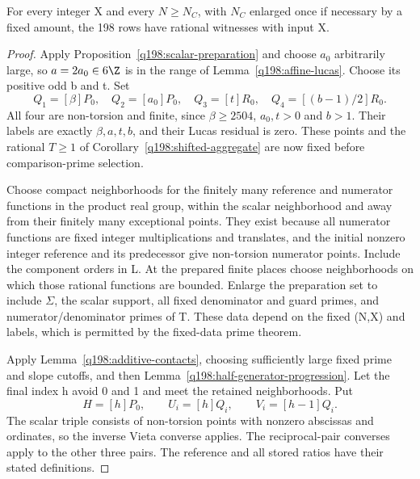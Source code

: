 \begin{proposition}\label{q198:completeness}
For every integer X and every $N\ge N_C$, with $N_C$ enlarged
once if necessary by a fixed amount, the 198 rows have rational
witnesses with input X.
\end{proposition}
\begin{proof}
Apply Proposition~\ref{q198:scalar-preparation} and choose $a_0$
arbitrarily large, so $a=2a_0\in6\Z$ is in the range of
Lemma~\ref{q198:affine-lucas}. Choose its positive odd b and t.
Set
\[
 Q_1=[\beta]P_0,\quad Q_2=[a_0]P_0,\quad Q_3=[t]R_0,\quad
 Q_4=[(b-1)/2]R_0.
\]
All four are non-torsion and finite, since $\beta\ge2504$,
$a_0,t>0$ and $b>1$. Their labels are exactly $\beta,a,t,b$,
and their Lucas residual is zero. These points and the rational
$T\ge1$ of Corollary~\ref{q198:shifted-aggregate} are now fixed
before comparison-prime selection.

Choose compact neighborhoods for the finitely many reference and
numerator functions in the product real group, within the scalar
neighborhood and away from their finitely many exceptional points.
They exist because all numerator functions are fixed integer
multiplications and translates, and the initial nonzero integer
reference and its predecessor give non-torsion numerator points.
Include the component orders in L. At the prepared finite places
choose neighborhoods on which those rational functions are bounded.
Enlarge the preparation set to include $\Sigma$, the scalar support,
all fixed denominator and guard primes, and numerator/denominator
primes of T. These data depend on the fixed (N,X) and labels,
which is permitted by the fixed-data prime theorem.

Apply Lemma~\ref{q198:additive-contacts}, choosing sufficiently
large fixed prime and slope cutoffs, and then
Lemma~\ref{q198:half-generator-progression}. Let the final index h
avoid 0 and 1 and meet the retained neighborhoods. Put
\[
 H=[h]P_0,\qquad U_i=[h]Q_i,\qquad V_i=[h-1]Q_i.
\]
The scalar triple consists of non-torsion points with nonzero
abscissas and ordinates, so the inverse Vieta converse applies.
The reciprocal-pair converses apply to the other three pairs.
The reference and all stored ratios have their stated definitions.


\end{proof}
